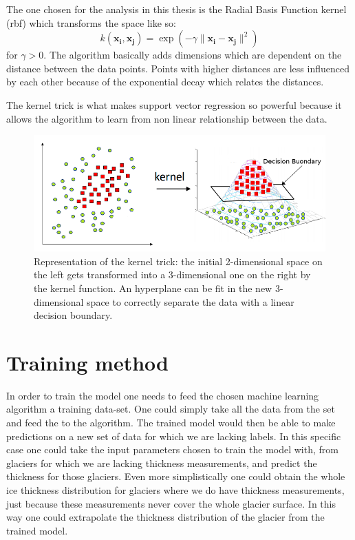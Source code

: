 The one chosen for the analysis in this thesis is the Radial Basis Function kernel (rbf) which transforms the space like so:
\begin{equation}\label{eq:rbf}
k({\mathbf {x_{i}}},{\mathbf {x_{j}}})=\exp(-\gamma \|\mathbf {x_{i}}-\mathbf {x_{j}}\|^{2})
\end{equation}
for $\gamma >0$.
The algorithm basically adds dimensions which are dependent on the distance between the data points. Points with higher distances are less influenced by each other because of the exponential decay which relates the distances.

The kernel trick is what makes support vector regression so powerful because it allows the algorithm to learn from non linear relationship between the data.

\begin{figure}[!tp]
	\centering		  
	\includegraphics[width=1.\textwidth]{figures/kernel_trick.png}
	\caption{Representation of the kernel trick: the initial 2-dimensional space on the left gets transformed into a 3-dimensional one on the right by the kernel function. An hyperplane can be fit in the new 3-dimensional space to correctly separate the data with a linear decision boundary.}
	\label{fig:kernel}
\end{figure}


\section{Training method}\label{training}
In order to train the model one needs to feed the chosen machine learning algorithm a training data-set. One could simply take all the data from the set and feed the to the algorithm. The trained model would then be able to make predictions on a new set of data for which we are lacking labels. In this specific case one could take the input parameters chosen to train the model with, from glaciers for which we are lacking thickness measurements, and predict the thickness for those glaciers. Even more simplistically one could obtain the whole ice thickness distribution for glaciers where we do have thickness measurements, just because these measurements never cover the whole glacier surface. In this way one could extrapolate the thickness distribution of the glacier from the trained model.

